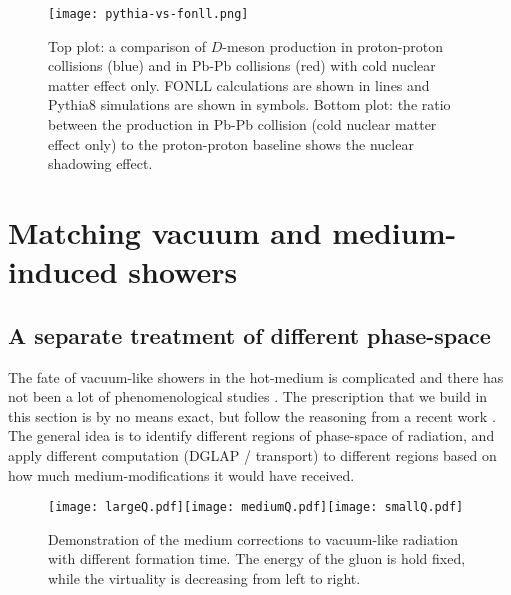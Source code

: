 \begin{figure}
\centering
\texttt{[image: pythia-vs-fonll.png]}
\caption{Top plot: a comparison of $D$-meson production in proton-proton collisions (blue) and in Pb-Pb collisions (red) with cold nuclear matter effect only. FONLL calculations are shown in lines and Pythia8 simulations are shown in symbols. Bottom plot: the ratio between the production in Pb-Pb collision (cold nuclear matter effect only) to the proton-proton baseline shows the nuclear shadowing effect.}
\label{fig:pythia-fonll}
\end{figure}

\section{Matching vacuum and medium-induced showers}
\subsection{A separate treatment of different phase-space}
\label{section:match}
The fate of vacuum-like showers in the hot-medium is complicated and there has not been a lot of phenomenological studies \cite{Cao:2017zih,PhysRevLett.120.232001,Caucal:2018tlu,Caucal:2018ofz}.
The prescription that we build in this section is by no means exact, but follow the reasoning from a recent work \cite{PhysRevLett.120.232001}.
The general idea is to identify different regions of phase-space of radiation, and apply different computation (DGLAP / transport) to different regions based on how much medium-modifications it would have received.

\begin{figure}
\texttt{[image: largeQ.pdf]}\texttt{[image: mediumQ.pdf]}\texttt{[image: smallQ.pdf]}
\caption{Demonstration of the medium corrections to vacuum-like radiation with different formation time. The energy of the gluon is hold fixed, while the virtuality is decreasing from left to right.}
\label{fig:vac-med-interface}
\end{figure}


